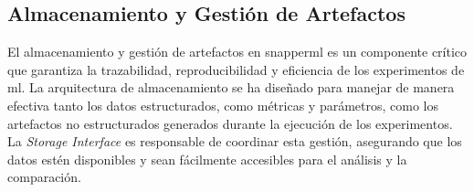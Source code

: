 \subsection{Almacenamiento y Gestión de Artefactos}

El almacenamiento y gestión de artefactos en \Gls{snapperml} es un componente crítico que garantiza la trazabilidad, reproducibilidad y eficiencia de los experimentos de \acrlong{ml}. La arquitectura de almacenamiento se ha diseñado para manejar de manera efectiva tanto los datos estructurados, como métricas y parámetros, como los artefactos no estructurados generados durante la ejecución de los experimentos. La \textit{Storage Interface} es responsable de coordinar esta gestión, asegurando que los datos estén disponibles y sean fácilmente accesibles para el análisis y la comparación.

